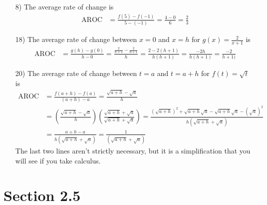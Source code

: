 \documentclass[fleqn]{article}
\begin{document}
\begin{enumerate}
\item[8)]
The average rate of change is
\begin{align*}
\text{AROC} &= \frac{f(5) - f(-1)}{5 - (-1)}
= \frac{ 4 - 0 }{ 6 }
= \frac{2}{3}
\end{align*}

\item[18)]
The average rate of change between $x = 0$ and $x = h$ for $g(x) = \frac{2}{x+1}$ is
\begin{align*}
\text{AROC} &= \frac{g(h) - g(0)}{h - 0} 
= \frac{ \frac{2}{h+1} - \frac{2}{0+1} }{h}
= \frac{ 2 - 2(h+1)}{h(h+1)}
= \frac{ -2h }{h(h+1)}
= \frac{-2}{h+1)}
\end{align*}

\item[20)]
The average rate of change between $t = a$ and $t = a+h$ for $f(t) = \sqrt{t}$ is
\begin{align*}
\text{AROC} &= \frac{ f(a+h) - f(a) }{(a+h) - a}
= \frac{ \sqrt{a+h} - \sqrt{a} }{h} \\
&= \left( \frac{ \sqrt{a+h} - \sqrt{a} }{h} \right) \left( \frac{ \sqrt{a+h} + \sqrt{a} }{ \sqrt{a+h} + \sqrt{a} } \right)
= \frac{ \left(\sqrt{a+h}\right)^2 + \sqrt{a+h}\sqrt{a} - \sqrt{a+h}\sqrt{a} - \left(\sqrt{a}\right)^2 }{ h\left( \sqrt{a+h} + \sqrt{a} \right) } \\
&= \frac{ a+h - a }{ h\left( \sqrt{a+h} + \sqrt{a} \right) }
= \frac{ 1 }{ \left( \sqrt{a+h} + \sqrt{a} \right) }
\end{align*}
The last two lines aren't strictly necessary, but it is a simplification that you will see if you take calculus.

\end{enumerate}

\section{Section 2.5}
\end{document}
